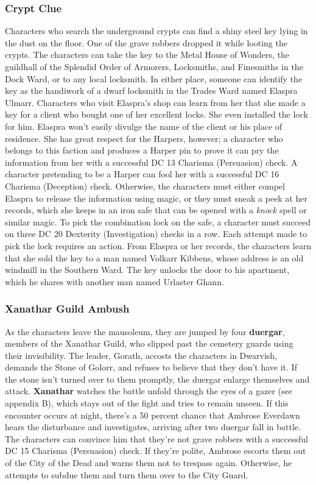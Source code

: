 \documentclass[10pt,a4paper,twoside,twocolumn,openany,nodeprecatedcode]{dndbook}
\begin{document}
\subsubsection{Crypt Clue}
Characters who search the underground crypts can find a shiny steel key lying in the dust on the floor. One of the grave robbers dropped it while looting the crypts.
The characters can take the key to the Metal House of Wonders, the guildhall of the Splendid Order of Armorers, Locksmiths, and Finesmiths in the Dock Ward, or to any local locksmith. In either place, someone can identify the key as the handiwork of a dwarf locksmith in the Trades Ward named Elaspra Ulmarr. Characters who visit Elaspra's shop can learn from her that she made a key for a client who bought one of her excellent locks. She even installed the lock for him. Elaspra won't easily divulge the name of the client or his place of residence. She has great respect for the Harpers, however; a character who belongs to this faction and produces a Harper pin to prove it can pry the information from her with a successful DC 13 Charisma (Persuasion) check. A character pretending to be a Harper can fool her with a successful DC 16 Charisma (Deception) check.
Otherwise, the characters must either compel Elaspra to release the information using magic, or they must sneak a peek at her records, which she keeps in an iron safe that can be opened with a \textit{knock} spell or similar magic. To pick the combination lock on the safe, a character must succeed on three DC 20 Dexterity (Investigation) checks in a row. Each attempt made to pick the lock requires an action.
From Elaspra or her records, the characters learn that she sold the key to a man named Volkarr Kibbens, whose address is an old windmill in the Southern Ward. The key unlocks the door to his apartment, which he shares with another man named Urlaster Ghann.
\subsubsection{Xanathar Guild Ambush}
As the characters leave the mausoleum, they are jumped by four \textbf{duergar}, members of the Xanathar Guild, who slipped past the cemetery guards using their invisibility. The leader, Gorath, accosts the characters in Dwarvish, demands the Stone of Golorr, and refuses to believe that they don't have it. If the stone isn't turned over to them promptly, the duergar enlarge themselves and attack. \textbf{Xanathar} watches the battle unfold through the eyes of a gazer (see appendix B), which stays out of the fight and tries to remain unseen.
If this encounter occurs at night, there's a 50 percent chance that Ambrose Everdawn hears the disturbance and investigates, arriving after two duergar fall in battle. The characters can convince him that they're not grave robbers with a successful DC 15 Charisma (Persuasion) check. If they're polite, Ambrose escorts them out of the City of the Dead and warns them not to trespass again. Otherwise, he attempts to subdue them and turn them over to the City Guard.
\end{document}
